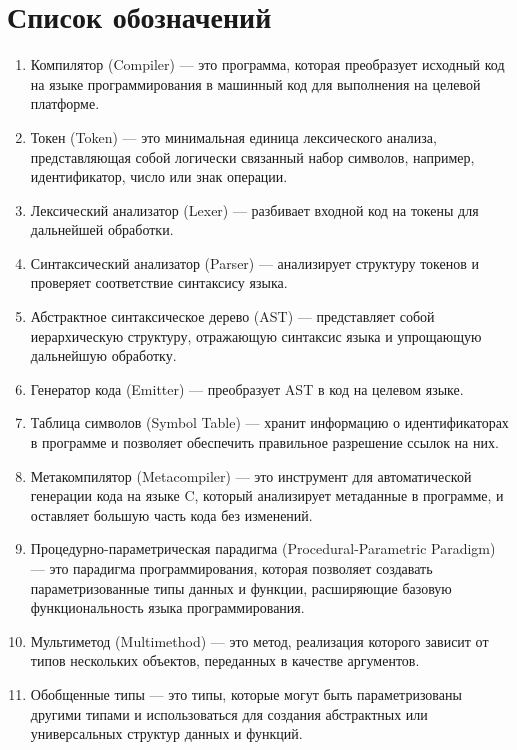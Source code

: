 \section{Список обозначений}

\begin{enumerate}
  \item Компилятор (Compiler) --- это программа, которая преобразует исходный код на языке программирования в машинный код для выполнения на целевой платформе.
  \item Токен (Token) --- это минимальная единица лексического анализа, представляющая собой логически связанный набор символов, например, идентификатор, число или знак операции.
  \item Лексический анализатор (Lexer) --- разбивает входной код на токены для дальнейшей обработки.
  \item Синтаксический анализатор (Parser) --- анализирует структуру токенов и проверяет соответствие синтаксису языка.
  \item Абстрактное синтаксическое дерево (AST) --- представляет собой иерархическую структуру, отражающую синтаксис языка и упрощающую дальнейшую обработку.
  \item Генератор кода (Emitter) --- преобразует AST в код на целевом языке.
  \item Таблица символов (Symbol Table) --- хранит информацию о идентификаторах в программе и позволяет обеспечить правильное разрешение ссылок на них.
  \item Метакомпилятор (Metacompiler) --- это инструмент для автоматической генерации кода на языке C, который анализирует метаданные в программе, и оставляет большую часть кода без изменений.

  \item Процедурно-параметрическая парадигма (Procedural-Parametric Paradigm) --- это парадигма программирования, которая позволяет создавать параметризованные типы данных и функции, расширяющие базовую функциональность языка программирования. %
  \item Мультиметод (Multimethod) --- это метод, реализация которого зависит от типов нескольких объектов, переданных в качестве аргументов.
  \item Обобщенные типы --- это типы, которые могут быть параметризованы другими типами и использоваться для создания абстрактных или универсальных структур данных и функций.
\end{enumerate}
